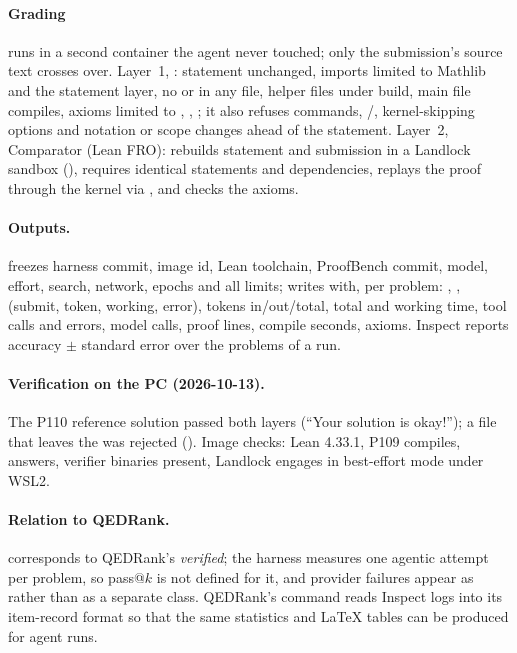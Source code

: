 \documentclass[11pt,a4paper]{article}
\begin{document}
\paragraph{Grading} runs in a second  container the agent never touched; only the submission's source text crosses over. Layer~1, : statement unchanged, imports limited to Mathlib and the statement layer, no  or  in any file, helper files under  build, main file compiles, axioms limited to , , ; it also refuses \code{\#} commands, /, kernel-skipping options and notation or scope changes ahead of the statement. Layer~2, Comparator \cite{comparator} (Lean FRO): rebuilds statement and submission in a Landlock \cite{landlock} sandbox (), requires identical statements and dependencies, replays the proof through the kernel via  \cite{lean4export}, and checks the axioms.

\paragraph{Outputs.}  freezes harness commit, image id, Lean toolchain, ProofBench commit, model, effort, search, network, epochs and all limits;  writes  with, per problem: , ,  (submit, token, working, error), tokens in/out/total, total and working time, tool calls and errors, model calls, proof lines, compile seconds, axioms. Inspect reports accuracy $\pm$ standard error over the problems of a run.

\paragraph{Verification on the PC (2026-10-13).} The P110 reference solution passed both layers (``Your solution is okay!''); a file that leaves the  was rejected (). Image checks: Lean 4.33.1, P109 compiles,  answers, verifier binaries present, Landlock engages in best-effort mode under WSL2.

\paragraph{Relation to QEDRank.}  corresponds to QEDRank's \emph{verified}; the harness measures one agentic attempt per problem, so pass@$k$ is not defined for it, and provider failures appear as  rather than as a separate class. QEDRank's  command reads Inspect logs into its item-record format so that the same statistics and LaTeX tables can be produced for agent runs.
\end{document}
